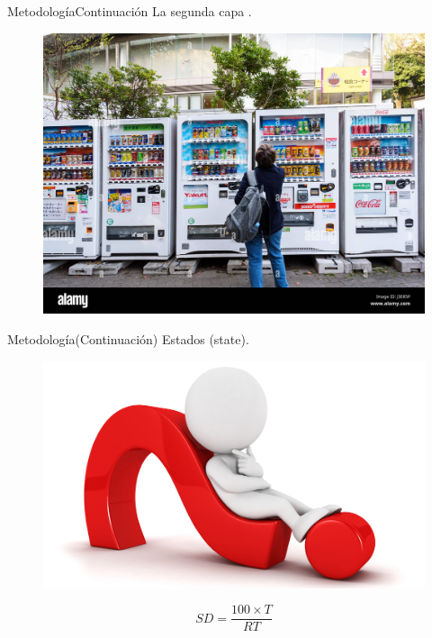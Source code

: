 \documentclass{beamer}
\begin{document}
\begin{frame}{Metodología}{Continuación}
	La segunda capa \citep{zhao2019improved}. 
	\begin{figure}
		\centering
		\includegraphics[scale = 0.5]{maquinaaescojer}
	\end{figure}
\end{frame}

\begin{frame}{Metodología}{(Continuación)}
	Estados (state).
	\begin{figure}
		\includegraphics[scale = 0.5]{preguntas}
	\end{figure}
	\begin{equation}
		SD = \dfrac{100 \times T}{RT}
	\end{equation}
\end{frame}
\end{document}
